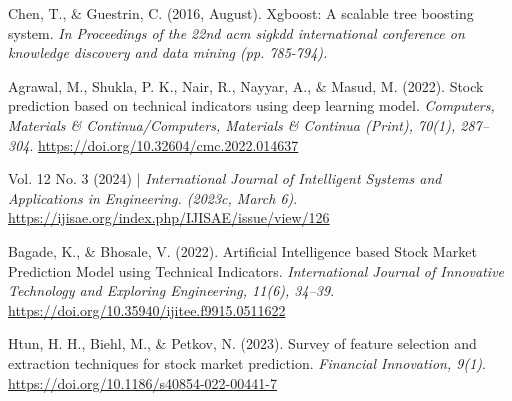 \documentclass{ieeeojies}
\begin{document}
\begin{thebibliography}{00}
     Chen, T., \& Guestrin, C. (2016, August). Xgboost: A scalable tree boosting system. \textit{In Proceedings of the 22nd acm sigkdd international conference on knowledge discovery and data mining (pp. 785-794).} 
    
     Agrawal, M., Shukla, P. K., Nair, R., Nayyar, A., \& Masud, M. (2022). Stock prediction based on technical indicators using deep learning model. \textit{Computers, Materials \& Continua/Computers, Materials \& Continua (Print), 70(1), 287–304}. \url{https://doi.org/10.32604/cmc.2022.014637} 

     Vol. 12 No. 3 (2024) | \textit{International Journal of Intelligent Systems and Applications in Engineering. (2023c, March 6)}. \url{https://ijisae.org/index.php/IJISAE/issue/view/126}

     Bagade, K., \& Bhosale, V. (2022). Artificial Intelligence based Stock Market Prediction Model using Technical Indicators. \textit{International Journal of Innovative Technology and Exploring Engineering, 11(6), 34–39}. \url{https://doi.org/10.35940/ijitee.f9915.0511622}

     Htun, H. H., Biehl, M., \& Petkov, N. (2023). Survey of feature selection and extraction techniques for stock market prediction. \textit{Financial Innovation, 9(1)}. \url{https://doi.org/10.1186/s40854-022-00441-7}

    

\end{thebibliography}

\EOD
\end{document}
